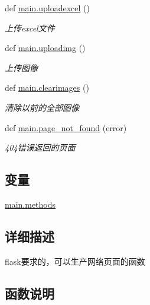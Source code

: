 \begin{DoxyCompactItemize}
def \mbox{\hyperlink{group___xE8_xB7_xAF_xE7_x94_xB1_xE5_x87_xBD_xE6_x95_xB0_gadc4862ff2e8d5f1dee064a0b2f9f3dc9}{main.\+uploadexcel}} ()
\begin{DoxyCompactList}\small\item\em 上传excel文件 \end{DoxyCompactList}\item 
def \mbox{\hyperlink{group___xE8_xB7_xAF_xE7_x94_xB1_xE5_x87_xBD_xE6_x95_xB0_gad28764d44d01ada36ff0dfbbcac903d5}{main.\+uploadimg}} ()
\begin{DoxyCompactList}\small\item\em 上传图像 \end{DoxyCompactList}\item 
def \mbox{\hyperlink{group___xE8_xB7_xAF_xE7_x94_xB1_xE5_x87_xBD_xE6_x95_xB0_gaf30661faaa34905b65c282bff34ede37}{main.\+clearimages}} ()
\begin{DoxyCompactList}\small\item\em 清除以前的全部图像 \end{DoxyCompactList}\item 
def \mbox{\hyperlink{group___xE8_xB7_xAF_xE7_x94_xB1_xE5_x87_xBD_xE6_x95_xB0_ga965cff435fee73194b14e9a6a7f3f2b8}{main.\+page\+\_\+not\+\_\+found}} (error)
\begin{DoxyCompactList}\small\item\em 404错误返回的页面 \end{DoxyCompactList}\end{DoxyCompactItemize}
\subsection*{变量}
\begin{DoxyCompactItemize}
\item 
\mbox{\hyperlink{group___xE8_xB7_xAF_xE7_x94_xB1_xE5_x87_xBD_xE6_x95_xB0_gad0a71fa7b4080e971323a6c3b1c16331}{main.\+methods}}
\end{DoxyCompactItemize}


\subsection{详细描述}
flask要求的，可以生产网络页面的函数 



\subsection{函数说明}
\mbox{\label{group___xE8_xB7_xAF_xE7_x94_xB1_xE5_x87_xBD_xE6_x95_xB0_gaf30661faaa34905b65c282bff34ede37}} 
